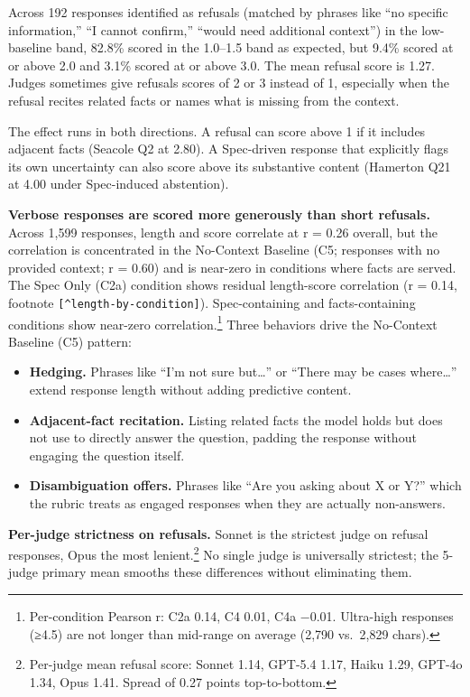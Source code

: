 Across 192 responses identified as refusals (matched by phrases like
``no specific information,'' ``I cannot confirm,'' ``would need
additional context'') in the low-baseline band, 82.8\% scored in the
1.0--1.5 band as expected, but 9.4\% scored at or above 2.0 and 3.1\%
scored at or above 3.0. The mean refusal score is 1.27. Judges sometimes
give refusals scores of 2 or 3 instead of 1, especially when the refusal
recites related facts or names what is missing from the context.

The effect runs in both directions. A refusal can score above 1 if it
includes adjacent facts (Seacole Q2 at 2.80). A Spec-driven response
that explicitly flags its own uncertainty can also score above its
substantive content (Hamerton Q21 at 4.00 under Spec-induced
abstention).

\textbf{Verbose responses are scored more generously than short
refusals.} Across 1,599 responses, length and score correlate at r =
0.26 overall, but the correlation is concentrated in the No-Context
Baseline (C5; responses with no provided context; r = 0.60) and is
near-zero in conditions where facts are served. The Spec Only (C2a)
condition shows residual length-score correlation (r = 0.14, footnote
\texttt{{[}\^{}length-by-condition{]}}). Spec-containing and
facts-containing conditions show near-zero correlation.\footnote{Per-condition
  Pearson r: C2a 0.14, C4 0.01, C4a −0.01. Ultra-high responses (≥4.5)
  are not longer than mid-range on average (2,790 vs.~2,829 chars).} Three
behaviors drive the No-Context Baseline (C5) pattern:

\begin{itemize}
\tightlist
\item
  \textbf{Hedging.} Phrases like ``I'm not sure but\ldots{}'' or ``There
  may be cases where\ldots{}'' extend response length without adding
  predictive content.
\item
  \textbf{Adjacent-fact recitation.} Listing related facts the model
  holds but does not use to directly answer the question, padding the
  response without engaging the question itself.
\item
  \textbf{Disambiguation offers.} Phrases like ``Are you asking about X
  or Y?'' which the rubric treats as engaged responses when they are
  actually non-answers.
\end{itemize}

\textbf{Per-judge strictness on refusals.} Sonnet is the strictest judge
on refusal responses, Opus the most lenient.\footnote{Per-judge mean
  refusal score: Sonnet 1.14, GPT-5.4 1.17, Haiku 1.29, GPT-4o 1.34,
  Opus 1.41. Spread of 0.27 points top-to-bottom.} No single judge is
universally strictest; the 5-judge primary mean smooths these
differences without eliminating them.

